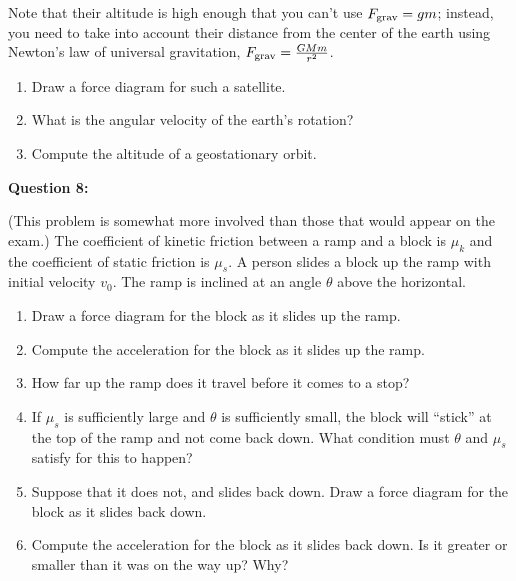 \documentclass[12pt]{article}
\begin{document}
Note that their altitude is high enough that you can't use $F_{\rm{grav}} = gm$; instead, you need to take into account their distance from the center of the earth using Newton's law of universal gravitation, $F_{\rm{grav}} = \frac{GMm}{r^2}$.

\begin{enumerate}
  \item{Draw a force diagram for such a satellite.}
  \item{What is the angular velocity of the earth's rotation?}
  \item{Compute the altitude of a geostationary orbit.}
\end{enumerate}





{\bf Question 8:}

(This problem is somewhat more involved than those that would appear on the exam.)
The coefficient of kinetic friction between a ramp and a block is $\mu_k$ and the coefficient of static friction is $\mu_s$. A person slides a block up the ramp with initial velocity $v_0$. The ramp is inclined at an angle
$\theta$ above the horizontal.

\begin{enumerate}
  \item{Draw a force diagram for the block as it slides up the ramp.}
  \item{Compute the acceleration for the block as it slides up the ramp.}
  \item{How far up the ramp does it travel before it comes to a stop?}
  \item{If $\mu_s$ is sufficiently large and $\theta$ is sufficiently small, the block will ``stick'' at the top of the ramp and not come back down. What condition must $\theta$ and $\mu_s$ satisfy for this to happen?}
  \item{Suppose that it does not, and slides back down. Draw a force diagram for the block as it slides back down.}
  \item{Compute the acceleration for the block as it slides back down. Is it greater or smaller than it was on the way up? Why?}
\end{enumerate}
\end{document}
